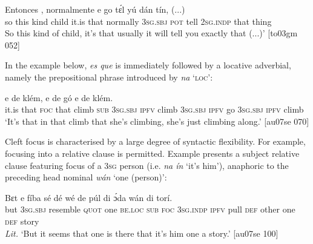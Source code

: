 \ea%
    \label{ex:key:714}
    \gll Entonces        ,        normalmente
e    go  tɛ́l  yú    dán  tín,  (...)\\
so      this  kind    child  it.is  that    normally    
\textsc{3sg.sbj}  \textsc{pot} tell  \textsc{2sg.indp}  that  thing\\

\glt So this kind of child, it’s that usually it will tell you exactly that (...)’ [to03gm 052]
\z

In the example below, \textit{es que} is immediately followed by a locative adverbial, namely the prepositional phrase introduced by \textit{na} ‘\textsc{loc’}:


\ea%
    \label{ex:key:715}
    \gll {}           e    de  klém,
e    de  gó e      de  klém.\\
it.is  that  \textsc{foc}  that  climb  \textsc{sub}  \textsc{3sg.sbj}  \textsc{ipfv}  climb
\textsc{3sg.sbj}  \textsc{ipfv}  go \textsc{3sg.sbj}    \textsc{ipfv}  climb\\

\glt ‘It’s that in that climb that she’s climbing, she’s just 
climbing along.’ [au07se 070]
\z

Cleft focus is characterised by a large degree of syntactic flexibility. For example, focusing into a relative clause is permitted. Example  presents a subject relative clause featuring focus of a \textsc{3sg} person (i.e. \textit{na ín} ‘it’s him’), anaphoric to the preceding head nominal \textit{wán} ‘one (person)’: 


\ea%
    \label{ex:key:716}
    \gll Bɛt  e    fíba      sé        dé    wé    
de  púl  di  ɔ́da    wán    di  torí.\\
but  \textsc{3sg.sbj}  resemble    \textsc{quot}    one    \textsc{be.loc}  \textsc{sub}  \textsc{foc}  \textsc{3sg.indp}
\textsc{ipfv}  pull  \textsc{def}  other  one    \textsc{def}  story\\

\glt 
\textit{Lit.} ‘But it seems that one is there that it’s him  one a story.’ [au07se 100]
\z

